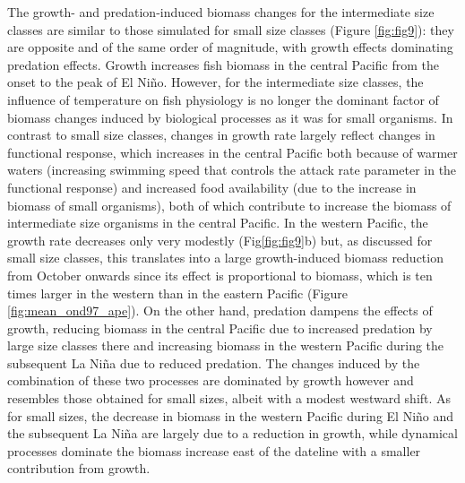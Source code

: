 The growth- and predation-induced biomass changes for the intermediate size classes are similar to those simulated for small size classes (Figure \ref{fig:fig9}): they are opposite and of the same order of magnitude, with growth effects dominating predation effects. Growth increases fish biomass in the central Pacific from the onset to the peak of El Niño. However, for the intermediate size classes, the influence of temperature on fish physiology is no longer the dominant factor of biomass changes induced by biological processes as it was for small organisms. In contrast to small size classes, changes in growth rate largely reflect changes in functional response, which increases in the central Pacific both because of warmer waters (increasing swimming speed that controls the attack rate parameter in the functional response) and increased food availability (due to the increase in biomass of small organisms), both of which contribute to increase the biomass of intermediate size organisms in the central Pacific. In the western Pacific, the growth rate decreases only very modestly (Fig\ref{fig:fig9}b) but, as discussed for small size classes, this translates into a large growth-induced biomass reduction from October onwards since its effect is proportional to biomass, which is ten times larger in the western than in the eastern Pacific (Figure \ref{fig:mean_ond97_ape}).
On the other hand, predation dampens the effects of growth, reducing biomass in the central Pacific due to increased predation by large size classes there and increasing biomass in the western Pacific during the subsequent La Niña due to reduced predation. The changes induced by the combination of these two processes are dominated by growth however and resembles those obtained for small sizes, albeit with a modest westward shift. As for small sizes, the decrease in biomass in the western Pacific during El Niño and the subsequent La Niña are largely due to a reduction in growth, while dynamical processes dominate the biomass increase east of the dateline with a smaller contribution from growth.


